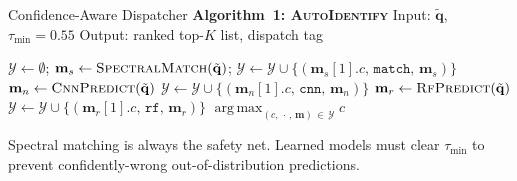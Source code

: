 \documentclass[aspectratio=169,10pt]{beamer}
\DeclareMathOperator*{\argmax}{arg\,max}
\begin{document}
\begin{frame}{Confidence-Aware Dispatcher}
  \textbf{Algorithm~1: \textsc{AutoIdentify}}\enspace
  {\small Input: $\tilde{\mathbf{q}}$, $\tau_{\min}=0.55$\quad
   Output: ranked top-$K$ list, dispatch tag}

  \smallskip
  \begin{tcolorbox}[enhanced, colback=white, colframe=gray!45,
      arc=2pt, boxrule=0.5pt, left=4pt, right=4pt, top=3pt, bottom=3pt]
    \scriptsize
    \begin{algorithmic}[1]
      \State $\mathcal{Y}\leftarrow\emptyset$;\quad
             $\mathbf{m}_s\leftarrow\textsc{SpectralMatch}(\tilde{\mathbf{q}})$;\quad
             $\mathcal{Y}\leftarrow\mathcal{Y}\cup\{(\mathbf{m}_s[1].c,\,\texttt{match},\,\mathbf{m}_s)\}$
        \State $\mathbf{m}_n\leftarrow\textsc{CnnPredict}(\tilde{\mathbf{q}})$
        \enspace
          $\mathcal{Y}\leftarrow\mathcal{Y}\cup\{(\mathbf{m}_n[1].c,\,\texttt{cnn},\,\mathbf{m}_n)\}$
        \EndIf
      \EndIf
        \State $\mathbf{m}_r\leftarrow\textsc{RfPredict}(\tilde{\mathbf{q}})$
        \enspace
          $\mathcal{Y}\leftarrow\mathcal{Y}\cup\{(\mathbf{m}_r[1].c,\,\texttt{rf},\,\mathbf{m}_r)\}$
        \EndIf
      \EndIf
      \State \Return $\argmax_{(c,\,\cdot\,,\,\mathbf{m})\,\in\,\mathcal{Y}}c$
    \end{algorithmic}
  \end{tcolorbox}

  \vspace{0.10cm}
  \begin{tcolorbox}[notebox, top=2pt, bottom=2pt]
    \small Spectral matching is always the safety net.
    Learned models must clear $\tau_{\min}$ to prevent
    confidently-wrong out-of-distribution predictions.
  \end{tcolorbox}
\end{frame}
\end{document}
